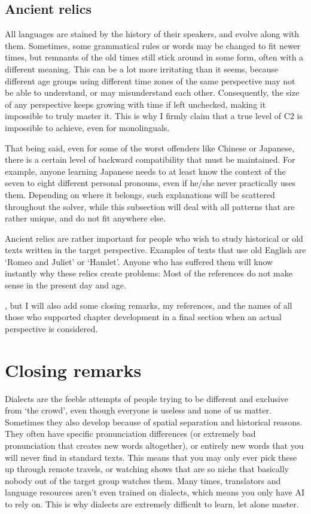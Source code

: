 \subsection{Ancient relics}
All languages are stained by the history of their speakers, and evolve along with them. Sometimes, some grammatical rules or words may be changed to fit newer times, but remnants of the old times still stick around in some form, often with a different meaning. This can  be a lot more irritating than it seems, because different age groups using different time zones of the same perspective may not be able to understand, or may misunderstand each other. Consequently, the size of any perspective keeps growing with time if left unchecked, making it impossible to truly master it. This is why I firmly claim that a true level of C2 is impossible to achieve, even for monolinguals.

That being said, even for some of the worst offenders like Chinese or Japanese, there is a certain level of backward compatibility that must be maintained. For example, anyone learning Japanese needs to at least know the context of the seven to eight different personal pronouns, even if he/she never practically uses them. Depending on where it belongs, such explanations will be scattered throughout the solver, while this subsection will deal with all patterns that are rather unique, and do not fit anywhere else.

Ancient relics are rather important for people who wish to study historical or old texts written in the target perspective.  Examples of texts that use old  English  are `Romeo and Juliet' or `Hamlet'. Anyone who has suffered them will know instantly why these relics create  problems: Most of the references do not make sense in the present day and age.

, but I will also add some closing remarks, my references, and the names of all those who supported chapter development  in a final section when an actual  perspective is considered.
\section{Closing remarks} \label{sec:enrmrk}
Dialects are the feeble attempts of people trying to be different and exclusive from `the crowd', even though everyone is useless and none of us matter. Sometimes they also develop because of spatial separation and historical reasons. They often  have specific pronunciation differences (or extremely bad pronunciation that creates new words altogether), or entirely new words that you will never find in standard texts. This means that you may only ever pick these up through remote travels, or watching shows that are so niche that basically nobody out of the target group watches them. Many times, translators and language resources aren't even trained on dialects, which means you only have AI to rely on. This is why dialects are extremely difficult to learn, let alone master.

